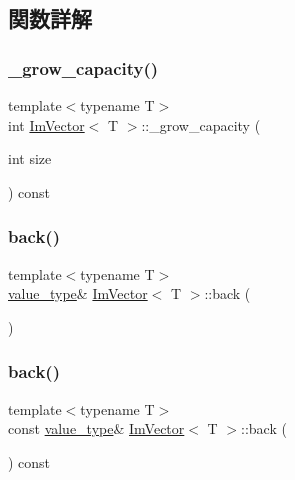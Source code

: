 \subsection{関数詳解}
\mbox{\label{class_im_vector_af9dfc79dfd89c904830bebc492a18310}} 
\subsubsection{\texorpdfstring{\+\_\+grow\+\_\+capacity()}{\_grow\_capacity()}}
{\footnotesize\ttfamily template$<$typename T$>$ \\
int \mbox{\hyperlink{class_im_vector}{Im\+Vector}}$<$ T $>$\+::\+\_\+grow\+\_\+capacity (\begin{DoxyParamCaption}\item[{int}]{size }\end{DoxyParamCaption}) const\hspace{0.3cm}{\ttfamily [inline]}}

\mbox{\label{class_im_vector_a3e4424d3fca190894598a6575f9d2401}} 
\subsubsection{\texorpdfstring{back()}{back()}\hspace{0.1cm}{\footnotesize\ttfamily [1/2]}}
{\footnotesize\ttfamily template$<$typename T$>$ \\
\mbox{\hyperlink{class_im_vector_a8bd77e4e7581d8e5f9e98d7c2f3c2a80}{value\+\_\+type}}\& \mbox{\hyperlink{class_im_vector}{Im\+Vector}}$<$ T $>$\+::back (\begin{DoxyParamCaption}{ }\end{DoxyParamCaption})\hspace{0.3cm}{\ttfamily [inline]}}

\mbox{\label{class_im_vector_a6f22918d4f139a1c4c3410ccae726f81}} 
\subsubsection{\texorpdfstring{back()}{back()}\hspace{0.1cm}{\footnotesize\ttfamily [2/2]}}
{\footnotesize\ttfamily template$<$typename T$>$ \\
const \mbox{\hyperlink{class_im_vector_a8bd77e4e7581d8e5f9e98d7c2f3c2a80}{value\+\_\+type}}\& \mbox{\hyperlink{class_im_vector}{Im\+Vector}}$<$ T $>$\+::back (\begin{DoxyParamCaption}{ }\end{DoxyParamCaption}) const\hspace{0.3cm}{\ttfamily [inline]}}

